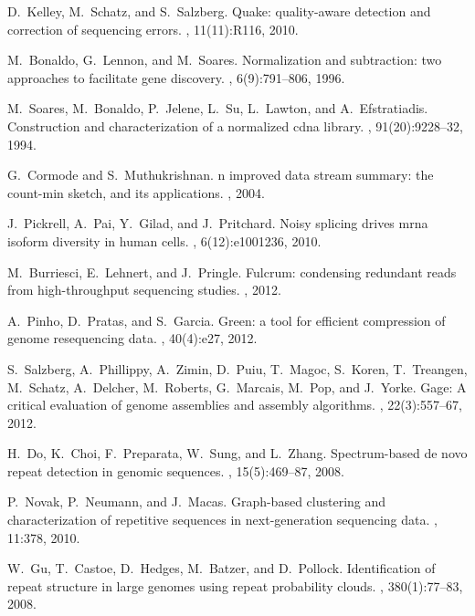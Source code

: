 \documentclass{pnastwo}
\begin{document}
\begin{article}
\begin{thebibliography}{10}
D.~Kelley, M.~Schatz, and S.~Salzberg.
\newblock Quake: quality-aware detection and correction of sequencing errors.
, 11(11):R116, 2010.

M.~Bonaldo, G.~Lennon, and M.~Soares.
\newblock Normalization and subtraction: two approaches to facilitate gene
  discovery.
, 6(9):791--806, 1996.

M.~Soares, M.~Bonaldo, P.~Jelene, L.~Su, L.~Lawton, and A.~Efstratiadis.
\newblock Construction and characterization of a normalized cdna library.
, 91(20):9228--32, 1994.

G.~Cormode and S.~Muthukrishnan.
n improved data stream summary: the count-min sketch, and its
  applications.
, 2004.

J.~Pickrell, A.~Pai, Y.~Gilad, and J.~Pritchard.
\newblock Noisy splicing drives mrna isoform diversity in human cells.
, 6(12):e1001236, 2010.

M.~Burriesci, E.~Lehnert, and J.~Pringle.
\newblock Fulcrum: condensing redundant reads from high-throughput sequencing
  studies.
, 2012.

A.~Pinho, D.~Pratas, and S.~Garcia.
\newblock Green: a tool for efficient compression of genome resequencing data.
, 40(4):e27, 2012.

S.~Salzberg, A.~Phillippy, A.~Zimin, D.~Puiu, T.~Magoc, S.~Koren, T.~Treangen,
  M.~Schatz, A.~Delcher, M.~Roberts, G.~Marcais, M.~Pop, and J.~Yorke.
\newblock Gage: A critical evaluation of genome assemblies and assembly
  algorithms.
, 22(3):557--67, 2012.

H.~Do, K.~Choi, F.~Preparata, W.~Sung, and L.~Zhang.
\newblock Spectrum-based de novo repeat detection in genomic sequences.
, 15(5):469--87, 2008.

P.~Novak, P.~Neumann, and J.~Macas.
\newblock Graph-based clustering and characterization of repetitive sequences
  in next-generation sequencing data.
, 11:378, 2010.

W.~Gu, T.~Castoe, D.~Hedges, M.~Batzer, and D.~Pollock.
\newblock Identification of repeat structure in large genomes using repeat
  probability clouds.
, 380(1):77--83, 2008.


\end{thebibliography}
\end{article}
\end{document}
